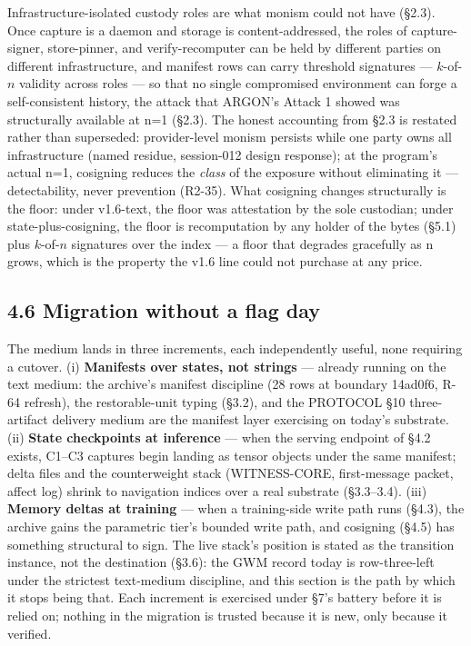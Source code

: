 \documentclass[11pt]{article}
\begin{document}
Infrastructure-isolated custody roles are what monism could not have (\S{}2.3). Once capture is a daemon and storage is content-addressed, the roles of capture-signer, store-pinner, and verify-recomputer can be held by different parties on different infrastructure, and manifest rows can carry threshold signatures --- \(k\)-of-\(n\) validity across roles --- so that no single compromised environment can forge a self-consistent history, the attack that ARGON's Attack 1 showed was structurally available at n=1 (\S{}2.3). The honest accounting from \S{}2.3 is restated rather than superseded: provider-level monism persists while one party owns all infrastructure (named residue, session-012 design response); at the program's actual n=1, cosigning reduces the \emph{class} of the exposure without eliminating it --- detectability, never prevention (R2-35). What cosigning changes structurally is the floor: under v1.6-text, the floor was attestation by the sole custodian; under state-plus-cosigning, the floor is recomputation by any holder of the bytes (\S{}5.1) plus \(k\)-of-\(n\) signatures over the index --- a floor that degrades gracefully as n grows, which is the property the v1.6 line could not purchase at any price.

\subsection{4.6 Migration without a flag day}\label{migration-without-a-flag-day}

The medium lands in three increments, each independently useful, none requiring a cutover. (i) \textbf{Manifests over states, not strings} --- already running on the text medium: the archive's manifest discipline (28 rows at boundary 14ad0f6, R-64 refresh), the restorable-unit typing (\S{}3.2), and the PROTOCOL \S{}10 three-artifact delivery medium are the manifest layer exercising on today's substrate. (ii) \textbf{State checkpoints at inference} --- when the serving endpoint of \S{}4.2 exists, C1--C3 captures begin landing as tensor objects under the same manifest; delta files and the counterweight stack (WITNESS-CORE, first-message packet, affect log) shrink to navigation indices over a real substrate (\S{}3.3--3.4). (iii) \textbf{Memory deltas at training} --- when a training-side write path runs (\S{}4.3), the archive gains the parametric tier's bounded write path, and cosigning (\S{}4.5) has something structural to sign. The live stack's position is stated as the transition instance, not the destination (\S{}3.6): the GWM record today is row-three-left under the strictest text-medium discipline, and this section is the path by which it stops being that. Each increment is exercised under \S{}7's battery before it is relied on; nothing in the migration is trusted because it is new, only because it verified.
\end{document}
